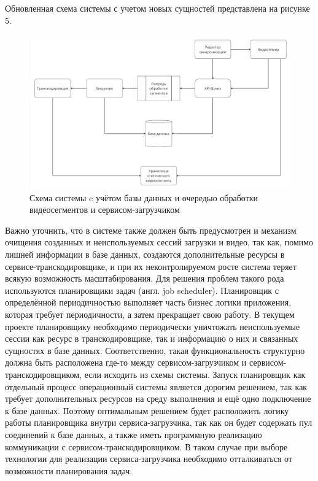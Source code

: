 	Обновленная схема системы с учетом новых сущностей представлена на рисунке 5.

	\begin{figure}[ht!] 
		\center
		\includegraphics [scale=0.33] {my_folder/images//system_scheme_4}
		\caption{Схема системы c учётом базы данных и очередью обработки видеосегментов и сервисом-загрузчиком} 
		\label{fig:system_scheme_4}  
	\end{figure}

	Важно уточнить, что в системе также должен быть предусмотрен и механизм очищения созданных и неиспользуемых сессий загрузки и видео, так как, помимо лишней информации в базе данных, создаются дополнительные ресурсы в сервисе-транскодировщике, и при их неконтролируемом росте система теряет всякую возможность масштабирования. Для решения проблем такого рода используются планировщики задач (англ. job scheduler). Планировщик с определённой периодичностью выполняет часть бизнес логики приложения, которая требует периодичности, а затем прекращает свою работу. В текущем проекте планировщику необходимо периодически уничтожать неиспользуемые сессии как ресурс в транскодировщике, так и информацию о них и связанных сущностях в базе данных. Соответственно, такая функциональность структурно должна быть расположена где-то между сервисом-загрузчиком и сервисом-транскодировщиком, если исходить из схемы системы. Запуск планировщик как отдельный процесс операционный системы является дорогим решением, так как требует дополнительных ресурсов на среду выполнения и ещё одно подключение к базе данных. Поэтому оптимальным решением будет расположить логику работы планировщика внутри сервиса-загрузчика, так как он будет содержать пул соединений к базе данных, а также иметь программную реализацию коммуникации с сервисом-транскодировщиком. В таком случае при выборе технологии для реализации сервиса-загрузчика необходимо отталкиваться от возможности планирования задач.

